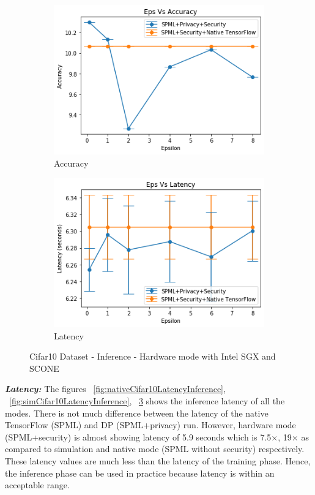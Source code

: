 \begin{figure}
     \begin{subfigure}{0.5\textwidth}
         \includegraphics[width=\textwidth]{images/Inference/Cifar10HwAccuracyInference.png}
         \caption{Accuracy}
         \label{fig:hwCifar10AccuracyInference}
     \end{subfigure}
     \begin{subfigure}{0.5\textwidth}
         \includegraphics[width=\textwidth]{images/Inference/Cifar10HwLatencyInference.png}
         \caption{Latency}
         \label{fig:hwCifar10LatencyInference}
     \end{subfigure}
        \caption{Cifar10 Dataset - Inference - Hardware mode with Intel SGX and SCONE}
\end{figure}
\newline
\newline
\textbf{\textit{Latency: }}The figures ~\ref{fig:nativeCifar10LatencyInference}, ~\ref{fig:simCifar10LatencyInference}, ~\ref{fig:hwCifar10LatencyInference} shows the inference latency of all the modes. There is not much difference between the latency of the native TensorFlow (SPML) and DP (SPML+privacy) run. However, hardware mode (SPML+security) is almost showing latency of 5.9 seconds which is 7.5$\times$, 19$\times$ as compared to simulation and native mode (SPML without security) respectively. These latency values are much less than the latency of the training phase. Hence, the inference phase can be used in practice because latency is within an acceptable range. 

